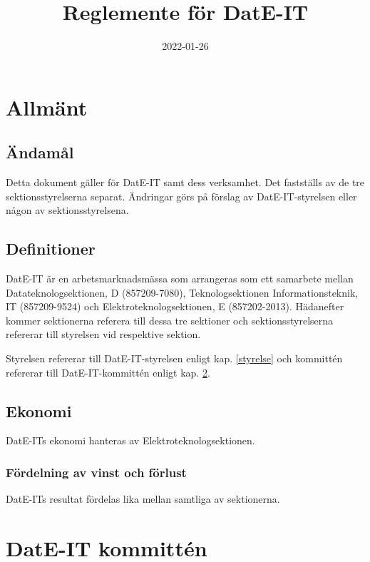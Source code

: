 \documentclass{article}
\title{Reglemente för DatE-IT}
\author{}
\date{2022-01-26}
\begin{document}
\maketitle

\begin{comment}
TODO 
- Fixa så att alla sektion pekar på detta dokument
- E ska fastslå budget men ska inte kunna ändra saker - delegerat detta mandat till oss
- Fullmakt från E
\end{comment}

\section{Allmänt}
\subsection{Ändamål}
Detta dokument gäller för DatE-IT samt dess verksamhet. Det fastställs av de tre sektionsstyrelserna separat. Ändringar görs på förslag av DatE-IT-styrelsen eller någon av sektionsstyrelsena.

\subsection{Definitioner}
DatE-IT är en arbetsmarknadsmässa som arrangeras som ett samarbete mellan Datateknologsektionen, D (857209-7080), Teknologsektionen Informationsteknik, IT (857209-9524) och Elektroteknologsektionen, E (857202-2013). Hädanefter kommer sektionerna referera till dessa tre sektioner och sektionsstyrelserna refererar till styrelsen vid respektive sektion.

Styrelsen refererar till DatE-IT-styrelsen enligt kap. \ref{styrelse} och kommittén refererar till DatE-IT-kommittén enligt kap. \ref{kommitte}.

\subsection{Ekonomi}
DatE-ITs ekonomi hanteras av Elektroteknologsektionen. 

\subsubsection{Fördelning av vinst och förlust}
DatE-ITs resultat fördelas lika mellan samtliga av sektionerna.

\section{DatE-IT kommittén}\label{kommitte}
\end{document}
